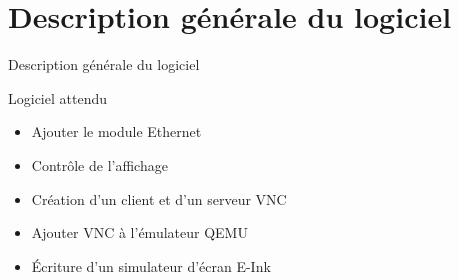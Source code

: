 \section[Description]{Description générale du logiciel}

\begin{frame}{Description générale du logiciel}

	\begin{block}{Logiciel attendu}

		\begin{itemize}	
			\item Ajouter le module Ethernet
			\item Contrôle de l'affichage
			\item Création d'un client et d'un serveur VNC
			\item Ajouter VNC à l'émulateur QEMU
			\item Écriture d'un simulateur d'écran E-Ink
		\end{itemize}

	\end{block}

\end{frame}


